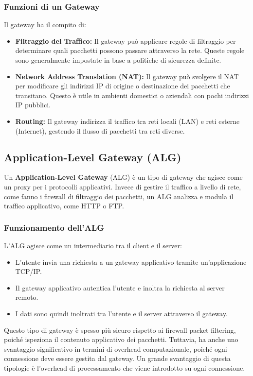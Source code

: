 \subsubsection{Funzioni di un Gateway}
Il gateway ha il compito di:
\begin{itemize}
  \item \textbf{Filtraggio del Traffico:} Il gateway può applicare regole di filtraggio per determinare quali pacchetti possono passare attraverso la rete. Queste regole sono generalmente impostate in base a politiche di sicurezza definite.
  \item \textbf{Network Address Translation (NAT):} Il gateway può svolgere il NAT per modificare gli indirizzi IP di origine o destinazione dei pacchetti che transitano. Questo è utile in ambienti domestici o aziendali con pochi indirizzi IP pubblici.
  \item \textbf{Routing:} Il gateway indirizza il traffico tra reti locali (LAN) e reti esterne (Internet), gestendo il flusso di pacchetti tra reti diverse.
\end{itemize}

\subsection{Application-Level Gateway (ALG)}
Un \textbf{Application-Level Gateway} (ALG) è un tipo di gateway che agisce come un proxy per i protocolli applicativi. Invece di gestire il traffico a livello di rete, come fanno i firewall di filtraggio dei pacchetti, un ALG analizza e modula il traffico applicativo, come HTTP o FTP.

\subsubsection{Funzionamento dell'ALG}
L'ALG agisce come un intermediario tra il client e il server:
\begin{itemize}
  \item L'utente invia una richiesta a un gateway applicativo tramite un'applicazione TCP/IP.
  \item Il gateway applicativo autentica l'utente e inoltra la richiesta al server remoto.
  \item I dati sono quindi inoltrati tra l'utente e il server attraverso il gateway.
\end{itemize}

Questo tipo di gateway è spesso più sicuro rispetto ai firewall packet filtering, poiché ispeziona il contenuto applicativo dei pacchetti. Tuttavia, ha anche uno svantaggio significativo in termini di overhead computazionale, poiché ogni connessione deve essere gestita dal gateway. Un grande svantaggio di questa tipologie è l'overhead di processamento  che viene introdotto su ogni connessione.


